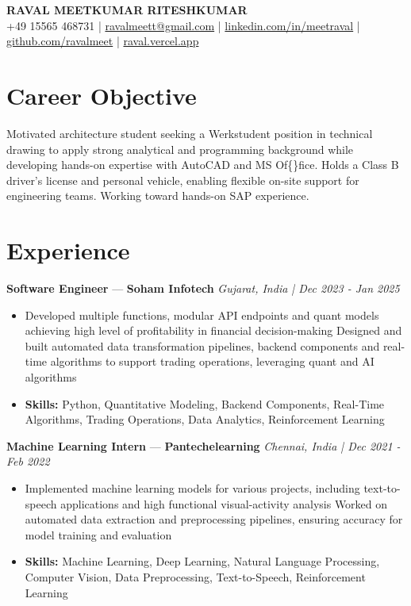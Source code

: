 \documentclass[a4paper,10pt]{article}
\begin{document}
\begin{center}
  {\Large\bfseries RAVAL MEETKUMAR RITESHKUMAR}\\[2pt]
  {\small +49 15565 468731 \;|\; \href{mailto:ravalmeett@gmail.com}{ravalmeett@gmail.com} \;|\; \href{https://www.linkedin.com/in/meetraval/}{linkedin.com/in/meetraval} \;|\; \href{https://github.com/ravalmeet}{github.com/ravalmeet} \;|\; \href{https://raval.vercel.app/}{raval.vercel.app}}
\end{center}
\vspace{-3pt}

\section*{Career Objective}
Motivated architecture student seeking a Werkstudent position in technical drawing to apply strong analytical and programming background while developing hands-on expertise with AutoCAD and MS Of\{\}fice. Holds a Class B driver's license and personal vehicle, enabling flexible on-site support for engineering teams. Working toward hands-on SAP experience.\par

\section*{Experience}
\textbf{Software Engineer} — \textbf{Soham Infotech} \hfill \textit{Gujarat, India \;|\; Dec 2023 - Jan 2025}\par
\vspace{1pt}
\begin{itemize}
  \item Developed multiple functions, modular API endpoints and quant models achieving high level of profitability in financial decision-making Designed and built automated data transformation pipelines, backend components and real-time algorithms to support trading operations, leveraging quant and AI algorithms
  \item \textbf{Skills:} Python, Quantitative Modeling, Backend Components, Real-Time Algorithms, Trading Operations, Data Analytics, Reinforcement Learning
\end{itemize}
\vspace{3pt}
\textbf{Machine Learning Intern} — \textbf{Pantechelearning} \hfill \textit{Chennai, India \;|\; Dec 2021 - Feb 2022}\par
\vspace{1pt}
\begin{itemize}
  \item Implemented machine learning models for various projects, including text-to-speech applications and high functional visual-activity analysis Worked on automated data extraction and preprocessing pipelines, ensuring accuracy for model training and evaluation
  \item \textbf{Skills:} Machine Learning, Deep Learning, Natural Language Processing, Computer Vision, Data Preprocessing, Text-to-Speech, Reinforcement Learning
\end{itemize}
\end{document}
